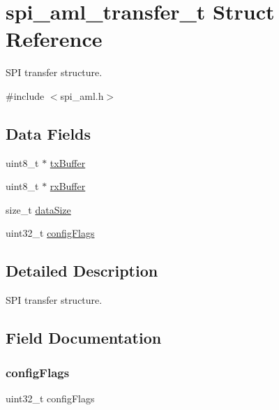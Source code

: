 \hypertarget{structspi__aml__transfer__t}{}\section{spi\+\_\+aml\+\_\+transfer\+\_\+t Struct Reference}
\label{structspi__aml__transfer__t}


S\+PI transfer structure.  




{\ttfamily \#include $<$spi\+\_\+aml.\+h$>$}

\subsection*{Data Fields}
\begin{DoxyCompactItemize}
\item 
uint8\+\_\+t $\ast$ \mbox{\hyperlink{structspi__aml__transfer__t_a9e34d8d39e2adcd636dea42296da5aa7}{tx\+Buffer}}
\item 
uint8\+\_\+t $\ast$ \mbox{\hyperlink{structspi__aml__transfer__t_a765da49a944f3916b674154f54e4edfa}{rx\+Buffer}}
\item 
size\+\_\+t \mbox{\hyperlink{structspi__aml__transfer__t_a78f9703861dd365a513c2c5aab9f9239}{data\+Size}}
\item 
uint32\+\_\+t \mbox{\hyperlink{structspi__aml__transfer__t_a8f596820084347c93c458b7553bdd067}{config\+Flags}}
\end{DoxyCompactItemize}


\subsection{Detailed Description}
S\+PI transfer structure. 

\subsection{Field Documentation}
\mbox{\label{structspi__aml__transfer__t_a8f596820084347c93c458b7553bdd067}} 
\subsubsection{\texorpdfstring{configFlags}{configFlags}}
{\footnotesize\ttfamily uint32\+\_\+t config\+Flags}

